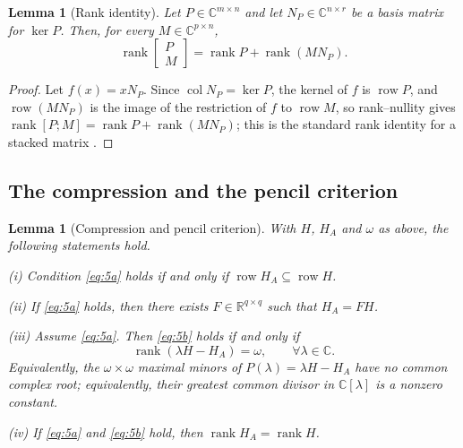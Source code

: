 \documentclass[journal]{IEEEtran}
\theoremstyle{plainn}
\newtheorem{lem}[thm]{Lemma}
\theoremstyle{remark}
\begin{document}
\begin{lem}[Rank identity]\label{lem:rankid}
Let $P\in\mathbb C^{m\times n}$ and let $N_P\in\mathbb C^{n\times r}$ be a basis matrix for $\ker P$. Then, for every $M\in\mathbb C^{p\times n}$,
\begin{equation}\label{eq:rankid}
\operatorname{rank}\begin{bmatrix}P\\ M\end{bmatrix}
=\operatorname{rank}P+\operatorname{rank}(MN_P).
\end{equation}
\end{lem}

\begin{proof}
Let $f(x)=xN_P$. Since $\operatorname{col}N_P=\ker P$, the kernel of $f$ is $\operatorname{row}P$,
and $\operatorname{row}(MN_P)$ is the image of the restriction of $f$ to $\operatorname{row}M$, so
rank--nullity gives $\operatorname{rank}[P;M]=\operatorname{rank}P+\operatorname{rank}(MN_P)$; this
is the standard rank identity for a stacked matrix \cite[Ch.~0]{hj13}.
\end{proof}

\subsection{The compression and the pencil criterion}\label{sec:compression}

\begin{lem}[Compression and pencil criterion]\label{lem:compression}
With $H$, $H_A$ and $\omega$ as above, the following statements hold.

(i) Condition \eqref{eq:5a} holds if and only if $\operatorname{row}H_A\subseteq\operatorname{row}H$.

(ii) If \eqref{eq:5a} holds, then there exists $F\in\mathbb R^{q\times q}$ such that $H_A=FH$.

(iii) Assume \eqref{eq:5a}. Then \eqref{eq:5b} holds if and only if
\begin{equation*}
\operatorname{rank}(\lambda H-H_A)=\omega,\qquad \forall\lambda\in\mathbb C .
\end{equation*}
Equivalently, the $\omega\times\omega$ maximal minors of $P(\lambda)=\lambda H-H_A$ have no common complex root; equivalently, their greatest common divisor in $\mathbb C[\lambda]$ is a nonzero constant.

(iv) If \eqref{eq:5a} and \eqref{eq:5b} hold, then $\operatorname{rank}H_A=\operatorname{rank}H$.
\end{lem}
\end{document}
